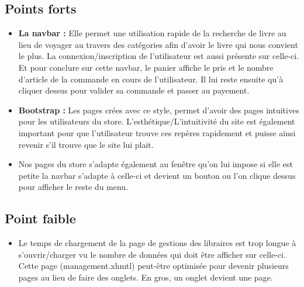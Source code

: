 	\subsection{Points forts}
	\begin{itemize}
		\item \textbf{La navbar :} Elle permet une utilisation rapide de la recherche de livre au lieu de voyager au travers des catégories afin d'avoir le livre qui nous convient le plus. La connexion/inscription de l'utilisateur est aussi présente sur celle-ci. Et pour conclure sur cette navbar, le panier affiche le pris et le nombre d'article de la commande en cours de l'utilisateur. Il lui reste ensuite qu'à cliquer dessus pour valider sa commande et passer au payement.

		\item \textbf{Bootstrap :} Les pages crées avec ce style, permet d'avoir des pages intuitives pour les utilisateurs du store. L'esthétique/L'intuitivité du site est également important pour que l'utilisateur trouve ces repères rapidement et puisse ainsi revenir s'il trouve que le site lui plait.

		\item Nos pages du store s'adapte également au fenêtre qu'on lui impose si elle est petite la navbar s'adapte à celle-ci et devient un bouton ou l'on clique dessus pour afficher le reste du menu.
	\end{itemize}


	\subsection{Point faible}
	\begin{itemize}
		\item Le temps de chargement de la page de gestions des libraires est trop longue à s'ouvrir/charger vu le nombre de données qui doit être afficher sur celle-ci. Cette page (management.xhmtl) peut-être optimisée pour devenir plusieurs pages au lieu de faire des onglets. En gros, un onglet devient une page.
	\end{itemize}
